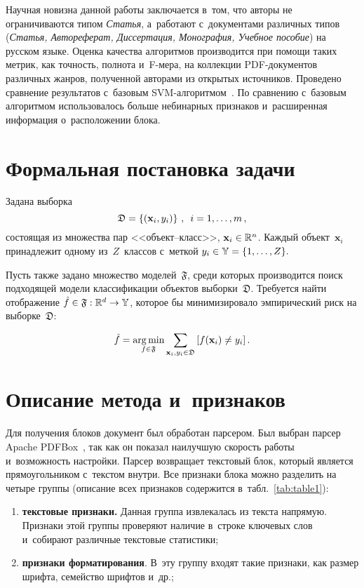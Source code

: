 \begin{multicols}{2}
Научная новизна данной работы заключается в~том, что авторы не ограничиваются 
типом \mbox{\textit{Статья}}, а~работают с~документами различных типов (\textit{Статья, 
Автореферат, Диссертация, Монография, Учебное пособие}) на рус\-ском языке. Оценка\linebreak 
качества алгоритмов производится при помощи\linebreak
 таких мет\-рик, как точ\-ность, полнота 
и~F-ме\-ра, на коллекции PDF-до\-ку\-мен\-тов различных жанров, полученной авторами из 
открытых источников. Проведено сравнение результатов с~базовым SVM-ал\-го\-рит\-мом~\cite{Kovacevic}. 
По сравнению с~базовым алгоритмом использовалось больше 
небинарных при\-зна\-ков и~расширенная информация о~расположении блока.


\section{Формальная постановка задачи}

Задана выборка 
$$
\mathfrak{D} = \left\{({\bf{x}}_i, y_i)\right\}\,, \enskip i = 1,\dots,m\,,
$$ 
состоящая из множества пар <<объ\-ект--класс>>, $\mathbf{x}_i \hm\in  \mathbb{R}^n$. 
Каждый объект~$\mathbf{x}_i$ принадлежит одному из~$Z$~классов с~меткой $y_i \hm\in 
\mathbb{Y} \hm= \{1,\dots,Z\}.$

Пусть также задано множество моделей~$\mathfrak{F}$, среди которых производится 
поиск подходящей модели классификации объектов выборки~$\mathfrak{D}$.
Требуется найти отоб\-ра\-же\-ние $\hat{f} \hm\in \mathfrak{F}: \mathbb{R}^d \hm\to 
\mathbb{Y}$, которое бы минимизировало эмпирический риск на вы\-бор\-ке~$\mathfrak{D}$:
{

}

\noindent
$$
\hat{f} = \underset{f \in \mathfrak{F}}{\mathop{\mathrm{arg}\,\mathrm{min}}}\sum\limits_{\mathbf{x}_i, y_i \in 
\mathfrak{D}}\left[f({\bf{x}}_i) \ne y_i\right].
$$


\section{Описание метода и~признаков}

Для получения блоков документ был обработан парсером. Был выбран парсер Apache 
PDFBox~\cite{PDFBox}, так как он показал наилучшую ско\-рость работы и~воз\-мож\-ность 
на\-строй\-ки. Парсер возвращает текс\-то\-вый блок, который является прямоугольником 
с~текс\-том внут\-ри. Все признаки блока можно раз\-де\-лить на четыре группы (описание 
всех признаков содержится в~табл.~\ref{tab:table1}):
\begin{enumerate}[(1)]
\item \textbf{текстовые признаки.} Данная группа извлекалась из текс\-та 
напрямую. Признаки этой группы проверяют наличие в~строке клю\-че\-вых слов 
и~собирают различные текс\-то\-вые статистики;
\item \textbf{признаки форматирования}. В~эту группу входят такие 
при\-зна\-ки, как размер шриф\-та, семейство шриф\-тов и~др.;


\end{enumerate}
\end{multicols}
